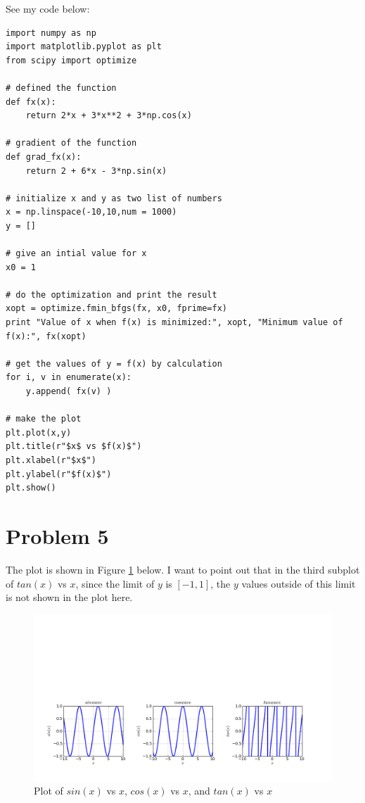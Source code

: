 See my code below:

\begin{verbatim}
import numpy as np
import matplotlib.pyplot as plt
from scipy import optimize

# defined the function
def fx(x):
    return 2*x + 3*x**2 + 3*np.cos(x)

# gradient of the function
def grad_fx(x):
    return 2 + 6*x - 3*np.sin(x)

# initialize x and y as two list of numbers
x = np.linspace(-10,10,num = 1000)
y = []

# give an intial value for x
x0 = 1

# do the optimization and print the result
xopt = optimize.fmin_bfgs(fx, x0, fprime=fx)
print "Value of x when f(x) is minimized:", xopt, "Minimum value of f(x):", fx(xopt)

# get the values of y = f(x) by calculation
for i, v in enumerate(x):
    y.append( fx(v) )

# make the plot
plt.plot(x,y)
plt.title(r"$x$ vs $f(x)$")
plt.xlabel(r"$x$")
plt.ylabel(r"$f(x)$")
plt.show()

\end{verbatim}


\section*{Problem 5}
The plot is shown in Figure \ref{tri} below. I want to point out that in the third subplot of $tan(x)$ vs $x$, since the limit of $y$ is $[-1,1]$, the $y$ values outside of this limit is not shown in the plot here. \\

\begin{figure}[htb]
\centering
\includegraphics[width=18cm]{triangular.png}
\caption{Plot of $sin(x)$ vs $x$, $cos(x)$ vs $x$, and $tan(x)$ vs $x$}
\label{tri}
\end{figure}

